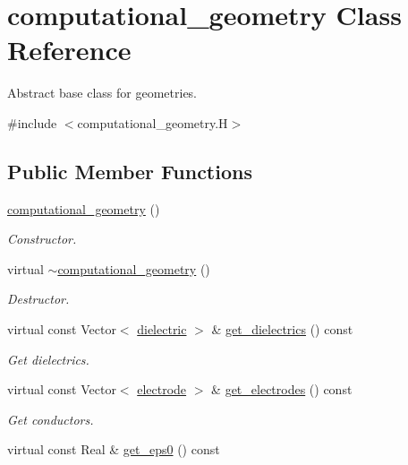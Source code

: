 \hypertarget{classcomputational__geometry}{}\section{computational\+\_\+geometry Class Reference}
\label{classcomputational__geometry}


Abstract base class for geometries.  




{\ttfamily \#include $<$computational\+\_\+geometry.\+H$>$}

\subsection*{Public Member Functions}
\begin{DoxyCompactItemize}
\item 
\hyperlink{classcomputational__geometry_ab7f35b670e473e929cea5538a2c1afaa}{computational\+\_\+geometry} ()
\begin{DoxyCompactList}\small\item\em Constructor. \end{DoxyCompactList}\item 
virtual \hyperlink{classcomputational__geometry_a5688f06dfcc41bd2e072103bf56aa1ad}{$\sim$computational\+\_\+geometry} ()
\begin{DoxyCompactList}\small\item\em Destructor. \end{DoxyCompactList}\item 
virtual const Vector$<$ \hyperlink{classdielectric}{dielectric} $>$ \& \hyperlink{classcomputational__geometry_aebff9ad65acb37cf7339b7c6dacc950a}{get\+\_\+dielectrics} () const 
\begin{DoxyCompactList}\small\item\em Get dielectrics. \end{DoxyCompactList}\item 
virtual const Vector$<$ \hyperlink{classelectrode}{electrode} $>$ \& \hyperlink{classcomputational__geometry_ab1c211b7608a4ff344f1dfa7550e4aa9}{get\+\_\+electrodes} () const 
\begin{DoxyCompactList}\small\item\em Get conductors. \end{DoxyCompactList}\item 
virtual const Real \& \hyperlink{classcomputational__geometry_ad2f3fbd2ac9b8f18e13f88924250be10}{get\+\_\+eps0} () const 

\end{DoxyCompactItemize}
